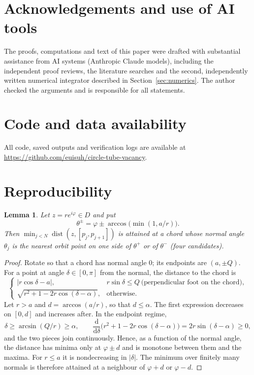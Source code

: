 \documentclass[11pt]{amsart}
\newtheorem{lemma}[theorem]{Lemma}
\theoremstyle{remark}
\DeclareMathOperator{\dist}{dist}
\begin{document}
\section*{Acknowledgements and use of AI tools}
The proofs, computations and text of this paper were drafted with substantial
assistance from AI systems (Anthropic Claude models), including the independent
proof reviews, the literature searches and the second, independently written numerical
integrator described in Section~\ref{sec:numerics}. The author checked the
arguments and is responsible for all statements.

\section*{Code and data availability}
All code, saved outputs and verification logs are available at
\url{https://github.com/euisuh/circle-tube-vacancy}.

\appendix


\section{Reproducibility}\label{app:repro}

\begin{lemma}\label{lem:fourcand}
Let $z=re^{i\varphi}\in D$ and put
\[
\theta^\pm=\varphi\pm\arccos\bigl(\min(1,a/r)\bigr).
\]
Then $\min_{j<N}\dist(z,[p_j,p_{j+1}])$ is attained at a chord whose normal angle $\theta_j$ is the
nearest orbit point on one side of $\theta^+$ or of $\theta^-$ (four candidates).
\end{lemma}

\begin{proof}
Rotate so that a chord has normal angle $0$; its endpoints are $(a,\pm Q)$. For a point at
angle $\delta\in[0,\pi]$ from the normal, the distance to the chord is
\[
\begin{cases}
|r\cos\delta-a|, & r\sin\delta\le Q\ \text{(perpendicular foot on the chord)},\\[0.5ex]
\sqrt{r^2+1-2r\cos(\delta-\alpha)}, & \text{otherwise}.
\end{cases}
\]
Let $r>a$ and $d=\arccos(a/r)$, so that $d\le\alpha$. The first expression decreases on
$[0,d]$ and increases after. In the endpoint regime,
\[
\delta\ge\arcsin(Q/r)\ge\alpha,\qquad
\frac{\mathrm d}{\mathrm d\delta}\bigl(r^2+1-2r\cos(\delta-\alpha)\bigr)=2r\sin(\delta-\alpha)\ge0 ,
\]
and the two pieces join continuously. Hence, as a function of the normal angle, the
distance has minima only at $\varphi\pm d$ and is monotone between them and the maxima.
For $r\le a$ it is nondecreasing in $|\delta|$. The minimum over finitely many normals is
therefore attained at a neighbour of $\varphi+d$ or $\varphi-d$.
\end{proof}
\end{document}
